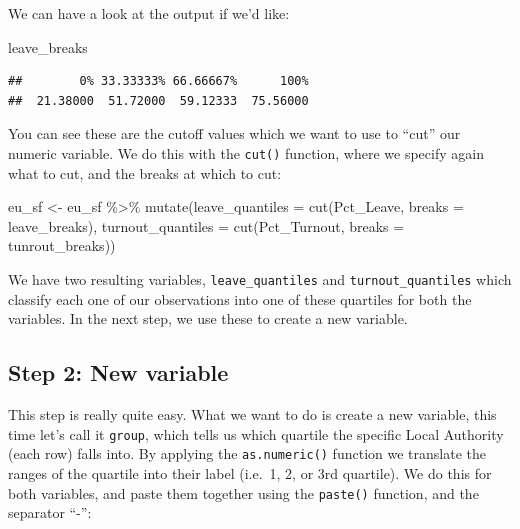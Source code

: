 \documentclass[
]{book}
\newenvironment{Shaded}{\begin{snugshade}}{\end{snugshade}}
\newcommand{\AttributeTok}[1]{\textcolor[rgb]{0.77,0.63,0.00}{#1}}
\newcommand{\FunctionTok}[1]{\textcolor[rgb]{0.00,0.00,0.00}{#1}}
\newcommand{\NormalTok}[1]{#1}
\newcommand{\OtherTok}[1]{\textcolor[rgb]{0.56,0.35,0.01}{#1}}
\newcommand{\SpecialCharTok}[1]{\textcolor[rgb]{0.00,0.00,0.00}{#1}}
\begin{document}
We can have a look at the output if we'd like:

\begin{Shaded}
\begin{Highlighting}[]
\NormalTok{leave\_breaks}
\end{Highlighting}
\end{Shaded}

\begin{verbatim}
##        0% 33.33333% 66.66667%      100% 
##  21.38000  51.72000  59.12333  75.56000
\end{verbatim}

You can see these are the cutoff values which we want to use to ``cut'' our numeric variable. We do this with the \texttt{cut()} function, where we specify again what to cut, and the breaks at which to cut:

\begin{Shaded}
\begin{Highlighting}[]
\NormalTok{eu\_sf }\OtherTok{\textless{}{-}}\NormalTok{ eu\_sf }\SpecialCharTok{\%\textgreater{}\%} 
  \FunctionTok{mutate}\NormalTok{(}\AttributeTok{leave\_quantiles =} \FunctionTok{cut}\NormalTok{(Pct\_Leave, }\AttributeTok{breaks =}\NormalTok{ leave\_breaks), }
         \AttributeTok{turnout\_quantiles =} \FunctionTok{cut}\NormalTok{(Pct\_Turnout, }\AttributeTok{breaks =}\NormalTok{ tunrout\_breaks))}
\end{Highlighting}
\end{Shaded}

We have two resulting variables, \texttt{leave\_quantiles} and \texttt{turnout\_quantiles} which classify each one of our observations into one of these quartiles for both the variables. In the next step, we use these to create a new variable.

\hypertarget{step-2-new-variable}{%
\subsection{Step 2: New variable}\label{step-2-new-variable}}

This step is really quite easy. What we want to do is create a new variable, this time let's call it \texttt{group}, which tells us which quartile the specific Local Authority (each row) falls into. By applying the \texttt{as.numeric()} function we translate the ranges of the quartile into their label (i.e.~1, 2, or 3rd quartile). We do this for both variables, and paste them together using the \texttt{paste()} function, and the separator ``-'':
\end{document}
